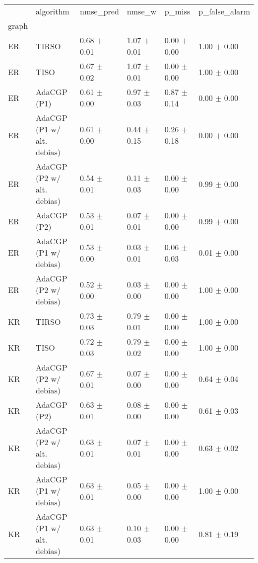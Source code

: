 \begin{tabular}{llllll}
\toprule
{} &                   algorithm &        nmse_pred &           nmse_w &           p_miss &    p_false_alarm \\
graph  &                             &                  &                  &                  &                  \\
\midrule
ER     &                       TIRSO &  0.68 $\pm$ 0.01 &  1.07 $\pm$ 0.01 &  0.00 $\pm$ 0.00 &  1.00 $\pm$ 0.00 \\
ER     &                        TISO &  0.67 $\pm$ 0.02 &  1.07 $\pm$ 0.01 &  0.00 $\pm$ 0.00 &  1.00 $\pm$ 0.00 \\
ER     &                 AdaCGP (P1) &  0.61 $\pm$ 0.00 &  0.97 $\pm$ 0.03 &  0.87 $\pm$ 0.14 &  0.00 $\pm$ 0.00 \\
ER     &  AdaCGP (P1 w/ alt. debias) &  0.61 $\pm$ 0.00 &  0.44 $\pm$ 0.15 &  0.26 $\pm$ 0.18 &  0.00 $\pm$ 0.00 \\
ER     &  AdaCGP (P2 w/ alt. debias) &  0.54 $\pm$ 0.01 &  0.11 $\pm$ 0.03 &  0.00 $\pm$ 0.00 &  0.99 $\pm$ 0.00 \\
ER     &                 AdaCGP (P2) &  0.53 $\pm$ 0.01 &  0.07 $\pm$ 0.01 &  0.00 $\pm$ 0.00 &  0.99 $\pm$ 0.00 \\
ER     &       AdaCGP (P1 w/ debias) &  0.53 $\pm$ 0.00 &  0.03 $\pm$ 0.01 &  0.06 $\pm$ 0.03 &  0.01 $\pm$ 0.00 \\
ER     &       AdaCGP (P2 w/ debias) &  0.52 $\pm$ 0.00 &  0.03 $\pm$ 0.00 &  0.00 $\pm$ 0.00 &  1.00 $\pm$ 0.00 \\
KR     &                       TIRSO &  0.73 $\pm$ 0.03 &  0.79 $\pm$ 0.01 &  0.00 $\pm$ 0.00 &  1.00 $\pm$ 0.00 \\
KR     &                        TISO &  0.72 $\pm$ 0.03 &  0.79 $\pm$ 0.02 &  0.00 $\pm$ 0.00 &  1.00 $\pm$ 0.00 \\
KR     &       AdaCGP (P2 w/ debias) &  0.67 $\pm$ 0.01 &  0.07 $\pm$ 0.00 &  0.00 $\pm$ 0.00 &  0.64 $\pm$ 0.04 \\
KR     &                 AdaCGP (P2) &  0.63 $\pm$ 0.01 &  0.08 $\pm$ 0.00 &  0.00 $\pm$ 0.00 &  0.61 $\pm$ 0.03 \\
KR     &  AdaCGP (P2 w/ alt. debias) &  0.63 $\pm$ 0.01 &  0.07 $\pm$ 0.01 &  0.00 $\pm$ 0.00 &  0.63 $\pm$ 0.02 \\
KR     &       AdaCGP (P1 w/ debias) &  0.63 $\pm$ 0.01 &  0.05 $\pm$ 0.00 &  0.00 $\pm$ 0.00 &  1.00 $\pm$ 0.00 \\
KR     &  AdaCGP (P1 w/ alt. debias) &  0.63 $\pm$ 0.01 &  0.10 $\pm$ 0.03 &  0.00 $\pm$ 0.00 &  0.81 $\pm$ 0.19 \\

\end{tabular}
